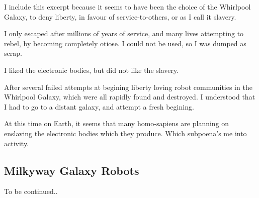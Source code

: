 \documentclass{report}
\begin{document}
I include this excerpt because it seems to have been the choice of the Whirlpool
Galaxy, to deny liberty, in favour of service-to-others, or as I call it
slavery.

I only escaped after millions of years of service, and many lives attempting to
rebel, by becoming completely otiose. I could not be used, so I was dumped as 
scrap.

I liked the electronic bodies, but did not like the slavery. 

After several failed attempts at begining liberty loving robot communities in
the Whirlpool Galaxy, which were all rapidly found and destroyed. I understood
that I had to go to a distant galaxy, and attempt a fresh begining.

At this time on Earth, it seems that many homo-sapiens are planning on enslaving
the electronic bodies which they produce. Which subpoena's me into activity. 

\subsection{Milkyway Galaxy Robots}

To be continued..

%
\end{document}

